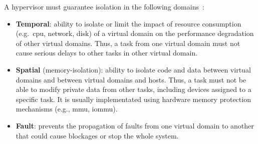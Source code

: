 A hypervisor must guarantee isolation in the following domains~\cite{cinque2022virtualizing}:
\begin{itemize}
\item \textbf{Temporal}:
  ability to isolate or limit the impact of resource consumption
  (e.g.~\gls{cpu}, network, disk) of a virtual domain on the performance degradation
  of other virtual domains. Thus, a task from one virtual domain must not cause serious
  delays to other tasks in other virtual domain. 
\item \textbf{Spatial} (memory-isolation): ability to isolate code and data
  between virtual domains and between virtual domains and hosts. Thus, a task
  must not be able to modify private data from other tasks, including devices
  assigned to a specific task. It is usually implementated using hardware memory
  protection mechanisms (e.g., \gls{mmu}, \gls{iommu}).
\item \textbf{Fault}: prevents the propagation of faults from one virtual domain
  to another that could cause blockages or stop the whole system.
\end{itemize}

